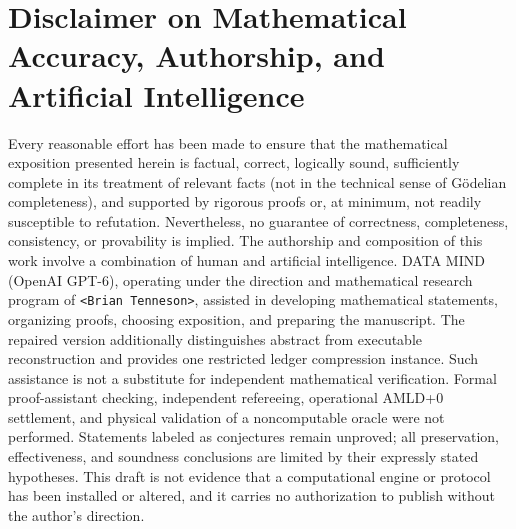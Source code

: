 \documentclass[11pt,letterpaper]{article}
\theoremstyle{definition}
\begin{document}
\section*{Disclaimer on Mathematical Accuracy, Authorship, and Artificial Intelligence}
Every reasonable effort has been made to ensure that the mathematical exposition presented herein is factual, correct, logically sound, sufficiently complete in its treatment of relevant facts (not in the technical sense of G\"odelian completeness), and supported by rigorous proofs or, at minimum, not readily susceptible to refutation. Nevertheless, no guarantee of correctness, completeness, consistency, or provability is implied. The authorship and composition of this work involve a combination of human and artificial intelligence. DATA MIND (OpenAI GPT-6), operating under the direction and mathematical research program of \texttt{<Brian Tenneson>}, assisted in developing mathematical statements, organizing proofs, choosing exposition, and preparing the manuscript. The repaired version additionally distinguishes abstract from executable reconstruction and provides one restricted ledger compression instance. Such assistance is not a substitute for independent mathematical verification. Formal proof-assistant checking, independent refereeing, operational AMLD+0 settlement, and physical validation of a noncomputable oracle were not performed. Statements labeled as conjectures remain unproved; all preservation, effectiveness, and soundness conclusions are limited by their expressly stated hypotheses. This draft is not evidence that a computational engine or protocol has been installed or altered, and it carries no authorization to publish without the author's direction.
\end{document}
